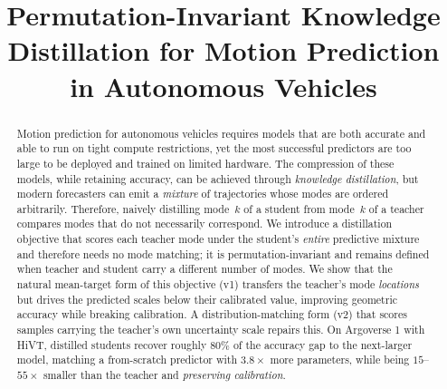 \documentclass[conference]{IEEEtran}
\begin{document}
\title{Permutation-Invariant Knowledge Distillation for 
Motion Prediction in Autonomous Vehicles}

\author{
}

\maketitle
\thispagestyle{empty}
\pagestyle{empty}

\begin{abstract}
Motion prediction for autonomous vehicles requires models that are both accurate 
and able to run on tight compute restrictions, yet the most successful predictors are too large 
to be deployed and trained on limited hardware. The compression of these models, while retaining accuracy, 
can be achieved through \emph{knowledge distillation}, but modern forecasters 
can emit a \emph{mixture} of trajectories whose modes are ordered arbitrarily. Therefore,
naively distilling mode~$k$ of a student from mode~$k$ of a teacher compares
modes that do not necessarily correspond. We introduce a distillation objective that
scores each teacher mode under the student's \emph{entire} predictive mixture and
therefore needs no mode matching; it is permutation-invariant and remains defined
when teacher and student carry a different number of modes. We show that the
natural mean-target form of this objective (v1) transfers the teacher's mode
\emph{locations} but drives the predicted scales below their calibrated
value, improving geometric accuracy while breaking calibration. A
distribution-matching form (v2) that scores samples carrying the teacher's own
uncertainty scale repairs this. 
On Argoverse 1 with HiVT, distilled students recover roughly $80\%$ 
of the accuracy gap to the next-larger model, matching 
a from-scratch predictor with $3.8\times$ more parameters, while being $15$--$55\times$ 
smaller than the teacher and \emph{preserving calibration}.
\end{abstract}
\end{document}
